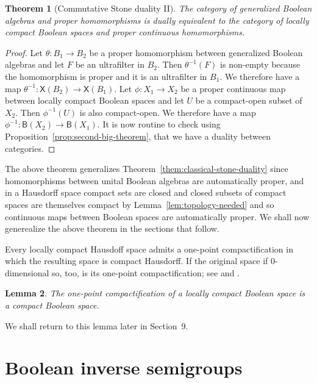 \documentclass[a4paper]{amsart}
\newtheorem{theorem}{Theorem}[section]
\newtheorem{lemma}[theorem]{Lemma}
\begin{document}
\begin{theorem}[Commutative Stone duality II]\label{them:classical-stone-dualityII} 
The category of generalized Bool\-ean algebras and proper homomorphisms
is dually equivalent to the category of locally compact Boolean spaces and proper continuous homomorphisms.
\end{theorem}
\begin{proof} Let $\theta \colon B_{1} \rightarrow B_{2}$ be a proper homomorphism between generalized Boolean algebras
and let $F$ be an ultrafilter in $B_{2}$.
Then $\theta^{-1}(F)$ is non-empty because the homomorphism is proper and it is an ultrafilter in $B_{1}$.
We therefore have a map $\theta^{-1} \colon \mathsf{X}(B_{2}) \rightarrow \mathsf{X}(B_{1})$.
Let $\phi \colon X_{1} \rightarrow X_{2}$ be a proper continuous map between locally compact Boolean spaces
and  let $U$ be a compact-open subset of $X_{2}$. 
Then $\phi^{-1}(U)$ is also compact-open.
We therefore have a map $\phi^{-1} \colon \mathsf{B}(X_{2}) \rightarrow \mathsf{B}(X_{1})$.
It is now routine to check using Proposition~\ref{prop:second-big-theorem},
that we have a duality between categories.
\end{proof}

The above theorem generalizes Theorem~\ref{them:classical-stone-duality}
since homomorphisms between unital Boolean algebras are automatically proper,
and in a Hausdorff space compact sets are closed and closed subsets of compact spaces are themselves compact by Lemma~\ref{lem:topology-needed}
and so continuous maps between Boolean spaces are automatically proper.
We shall now generealize the above theorem in the sections that follow.


Every locally compact Hausdoff space admits a one-point compactification \cite[Section 37]{Simmons}
in which the resulting space is compact Hausdorff.
If the original space if $0$-dimensional so, too, is its one-point compactification;
see \cite[Exercise 43.19]{GH} and \cite[page 387]{Stone1937}.


\begin{lemma}\label{lem:one-point}
The one-point compactification of a locally compact Boolean space is a compact Boolean space.
\end{lemma}

We shall return to this lemma later in Section~9.


\section{Boolean inverse semigroups}
\end{document}
